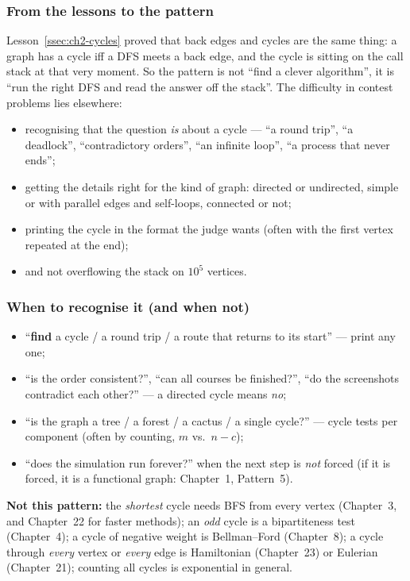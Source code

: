 \subsubsection*{From the lessons to the pattern}

Lesson~\ref{ssec:ch2-cycles} proved that back edges and cycles are the same thing: a graph has a cycle iff a DFS meets a back edge, and the cycle is sitting on the call stack at that very moment. So the pattern is not ``find a clever algorithm'', it is ``run the right DFS and read the answer off the stack''. The difficulty in contest problems lies elsewhere:
\begin{itemize}[leftmargin=*]
    \item recognising that the question \emph{is} about a cycle --- ``a round trip'', ``a deadlock'', ``contradictory orders'', ``an infinite loop'', ``a process that never ends'';
    \item getting the details right for the kind of graph: directed or undirected, simple or with parallel edges and self-loops, connected or not;
    \item printing the cycle in the format the judge wants (often with the first vertex repeated at the end);
    \item and not overflowing the stack on $10^5$ vertices.
\end{itemize}

\subsubsection*{When to recognise it (and when not)}

\begin{itemize}[leftmargin=*]
    \item ``\textbf{find} a cycle / a round trip / a route that returns to its start'' --- print any one;
    \item ``is the order consistent?'', ``can all courses be finished?'', ``do the screenshots contradict each other?'' --- a directed cycle means \emph{no};
    \item ``is the graph a tree / a forest / a cactus / a single cycle?'' --- cycle tests per component (often by counting, $m$ vs.\ $n - c$);
    \item ``does the simulation run forever?'' when the next step is \emph{not} forced (if it is forced, it is a functional graph: Chapter~1, Pattern~5).
\end{itemize}
\textbf{Not this pattern:} the \emph{shortest} cycle needs BFS from every vertex (Chapter~3, and Chapter~22 for faster methods); an \emph{odd} cycle is a bipartiteness test (Chapter~4); a cycle of negative weight is Bellman--Ford (Chapter~8); a cycle through \emph{every} vertex or \emph{every} edge is Hamiltonian (Chapter~23) or Eulerian (Chapter~21); counting all cycles is exponential in general.

